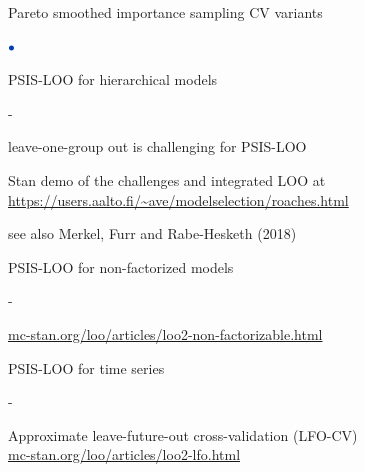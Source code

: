 \documentclass[english,t]{beamer}
\newenvironment{list1}{
   \begin{list}{$\color{list1}\bullet$}{\itemsep=6pt}}{
  \end{list}}
\newenvironment{list2}{
  \begin{list}{-}{\baselineskip=12pt\itemsep=2pt}}{
  \end{list}}
\begin{document}



  

\begin{frame}{Pareto smoothed importance sampling CV variants}

\begin{list1}
\item PSIS-LOO for hierarchical models
  \begin{list2}
  \item leave-one-group out is challenging for PSIS-LOO\\ \vspace{0.2\baselineskip}
    
  \item Stan demo of the challenges and integrated LOO at \url{https://users.aalto.fi/~ave/modelselection/roaches.html}
  \item {\small see also Merkel, Furr and Rabe-Hesketh (2018)}
  \end{list2}
  \item<2-> PSIS-LOO for non-factorized models
    \begin{list2}
    \item {\url{mc-stan.org/loo/articles/loo2-non-factorizable.html}}
    \end{list2}
  \item<3-> PSIS-LOO for time series
  \begin{list2}
  \item Approximate leave-future-out cross-validation (LFO-CV) \\ \vspace{0.2\baselineskip}
    {\url{mc-stan.org/loo/articles/loo2-lfo.html}}
  \end{list2}
\end{list1}

\end{frame}
\end{document}
